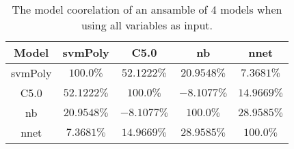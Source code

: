 \begin{table}[!ht]
	\centering
	\begin{tabular}{|c|c|c|c|c|}
		\hline
		Model & svmPoly & C5.0 & nb & nnet \\ \hline
		svmPoly & $100.0\%$ & $52.1222\%$ & $20.9548\%$ & $7.3681\%$ \\ \hline
		C5.0 & $52.1222\%$ & $100.0\%$ & $-8.1077\%$ & $14.9669\%$ \\ \hline
		nb & $20.9548\%$ & $-8.1077\%$ & $100.0\%$ & $28.9585\%$ \\ \hline
		nnet & $7.3681\%$ & $14.9669\%$ & $28.9585\%$ & $100.0\%$ \\ \hline
	\end{tabular}
	\caption{The model coorelation of an ansamble of 4 models when using all variables as input.}
	\label{tab:ansamble4:all}
\end{table}
